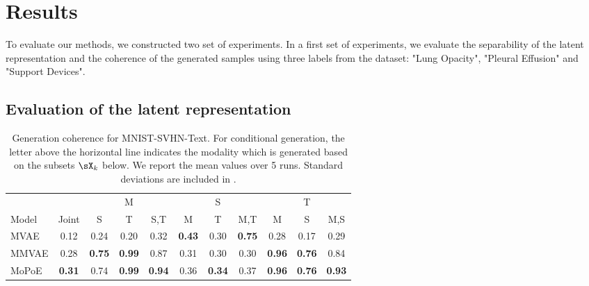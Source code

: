 \section{Results}

To evaluate our methods, we constructed two set of experiments.
In a first set of experiments, we evaluate the separability of the latent representation and the coherence of the generated samples using three labels from the dataset: "Lung Opacity", "Pleural Effusion" and "Support Devices".

\subsection{Evaluation of the latent representation}


\begin{table}
\caption{Generation coherence for MNIST-SVHN-Text. For conditional generation, the letter above the horizontal line indicates the modality which is generated based on the subsets $\sX_k$ below. We report the mean values over 5 runs. Standard deviations are included in  .}
\label{tab:mst_generation_coherence}
\begin{center}
\begin{small}
    \begin{sc}
    \begin{tabular}{lcccccccccc}
        &  & \multicolumn{3}{c}{M} & \multicolumn{3}{c}{S} & \multicolumn{3}{c}{T} \\
        \cmidrule(l){3-5} \cmidrule(l){6-8} \cmidrule(l){9-11}
        Model & Joint & S & T & S,T & M & T & M,T & M & S & M,S \\
        \midrule
        MVAE & 0.12 & 0.24 & 0.20 & 0.32 & \textbf{0.43} & 0.30 & \textbf{0.75} & 0.28 & 0.17 & 0.29 \\
        MMVAE & 0.28 & \textbf{0.75} & \textbf{0.99} & 0.87 & 0.31 & 0.30 & 0.30 & \textbf{0.96} & \textbf{0.76} & 0.84 \\
        MoPoE & \textbf{0.31} & 0.74 & \textbf{0.99} & \textbf{0.94} & 0.36 & \textbf{0.34} & 0.37 & \textbf{0.96} & \textbf{0.76} & \textbf{0.93} \\
    \end{tabular}
    \end{sc}
\end{small}
\end{center}
\end{table}

